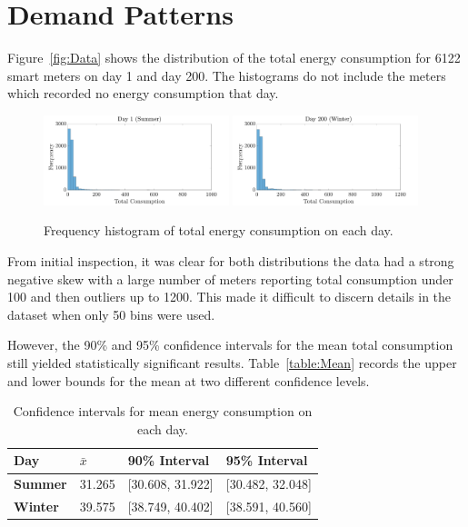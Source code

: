 \documentclass[a4paper,10pt]{article}
\begin{document}
\section{Demand Patterns}

Figure~\vref{fig:Data} shows the distribution of the total energy consumption 
for 6122 smart meters on day 1 and day 200. The histograms do not include the 
meters which recorded no energy consumption that day.
    
\begin{figure}[h]
    \centering
    \includegraphics[width=0.48\textwidth]{Day1}
    \includegraphics[width=0.48\textwidth]{Day200}
    \caption{Frequency histogram of total energy consumption on each day.}
    \label{fig:Data}
\end{figure}

From initial inspection, it was clear for both distributions the data had a 
strong negative skew with a large number of meters reporting total consumption 
under 100 and then outliers up to 1200. This made it difficult to discern 
details in the dataset when only 50 bins were used.

However, the 90\% and 95\% confidence intervals for the mean total consumption 
still yielded statistically significant results. Table~\vref{table:Mean} 
records the upper and lower bounds for the mean at two different confidence 
levels.

\begin{table}[h]
    \centering
    \begin{tabular}{llll}
        \toprule
        \textbf{Day} & $\bar{x}$ & 90\% Interval & 95\% Interval \\
        \midrule
        \textbf{Summer} & 31.265 & [30.608, 31.922] & [30.482, 32.048] \\
        \textbf{Winter} & 39.575 & [38.749, 40.402] & [38.591, 40.560] \\
        \bottomrule
    \end{tabular}
    \caption{Confidence intervals for mean energy consumption on each day.}
    \label{table:Mean}
\end{table}
\end{document}
